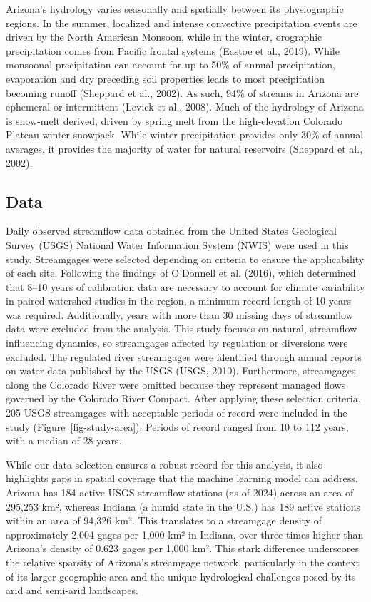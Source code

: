 \documentclass[
]{agujournal2019}
\begin{document}
Arizona's hydrology varies seasonally and spatially between its
physiographic regions. In the summer, localized and intense convective
precipitation events are driven by the North American Monsoon, while in
the winter, orographic precipitation comes from Pacific frontal systems
(Eastoe et al., 2019). While monsoonal precipitation can account for up
to 50\% of annual precipitation, evaporation and dry preceding soil
properties leads to most precipitation becoming runoff (Sheppard et al.,
2002). As such, 94\% of streams in Arizona are ephemeral or intermittent
(Levick et al., 2008). Much of the hydrology of Arizona is snow-melt
derived, driven by spring melt from the high-elevation Colorado Plateau
winter snowpack. While winter precipitation provides only 30\% of annual
averages, it provides the majority of water for natural reservoirs
(Sheppard et al., 2002).

\subsection{Data}\label{sec-data}

Daily observed streamflow data obtained from the United States
Geological Survey (USGS) National Water Information System (NWIS) were
used in this study. Streamgages were selected depending on criteria to
ensure the applicability of each site. Following the findings of
O'Donnell et al. (2016), which determined that 8--10 years of
calibration data are necessary to account for climate variability in
paired watershed studies in the region, a minimum record length of 10
years was required. Additionally, years with more than 30 missing days
of streamflow data were excluded from the analysis. This study focuses
on natural, streamflow-influencing dynamics, so streamgages affected by
regulation or diversions were excluded. The regulated river streamgages
were identified through annual reports on water data published by the
USGS (USGS, 2010). Furthermore, streamgages along the Colorado River
were omitted because they represent managed flows governed by the
Colorado River Compact. After applying these selection criteria, 205
USGS streamgages with acceptable periods of record were included in the
study (Figure~\ref{fig-study-area}). Periods of record ranged from 10 to
112 years, with a median of 28 years.

While our data selection ensures a robust record for this analysis, it
also highlights gaps in spatial coverage that the machine learning model
can address. Arizona has 184 active USGS streamflow stations (as of
2024) across an area of 295,253 km², whereas Indiana (a humid state in
the U.S.) has 189 active stations within an area of 94,326 km². This
translates to a streamgage density of approximately 2.004 gages per
1,000 km² in Indiana, over three times higher than Arizona's density of
0.623 gages per 1,000 km². This stark difference underscores the
relative sparsity of Arizona's streamgage network, particularly in the
context of its larger geographic area and the unique hydrological
challenges posed by its arid and semi-arid landscapes.
\end{document}
